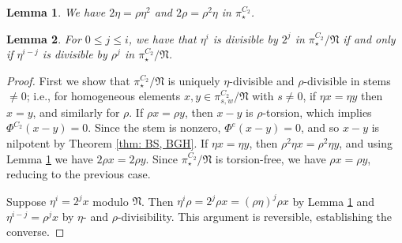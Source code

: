 \documentclass[10pt,a4paper]{amsart}
\newtheorem{lemma}{Lemma}
\newcommand{\fN}{\mathfrak N}
\begin{document}
\begin{lemma}\label{lem:2eta}
We have $2\eta = \rho \eta^2$ and $2\rho = \rho^2 \eta$ in $\pi_\star^{C_2}$.
\end{lemma}

\begin{lemma}\label{lem:2-to-eta}
For $0\leq j\leq i$,
we have that $\eta^i$ is divisible by $2^j$ in $\pi_\star^{C_2}/\fN$ if and only if
$\eta^{i-j}$ is divisible by $\rho^j$ in $\pi_\star^{C_2}/\fN$.
\end{lemma}

\begin{proof}
First we show that $\pi_\star^{C_2}/\fN$ is uniquely $\eta$-divisible and
$\rho$-divisible in stems $\neq 0$; i.e., for homogeneous elements $x,y\in
\pi_{s,w}^{C_2}/\fN$ with $s\neq 0$,
if $\eta x = \eta y$ then $x = y$, and similarly for $\rho$.
If $\rho x = \rho y$, then $x-y$ is $\rho$-torsion, which implies
$\Phi^{C_2}(x-y)=0$. Since the stem is nonzero, $\Phi^e(x-y)=0$, and so $x-y$ is
nilpotent by Theorem \ref{thm: BS, BGH}.
If $\eta x = \eta y$, then $\rho^2 \eta x = \rho^2 \eta y$, and using Lemma
\ref{lem:2eta} we have $2\rho x = 2\rho y$. Since $\pi_\star^{C_2}/\fN$ is
torsion-free, we have $\rho x = \rho y$, reducing to the previous case.

Suppose $\eta^i = 2^j x$ modulo $\fN$. Then $\eta^i \rho = 2^j \rho x = (\rho
\eta)^j \rho x$ by Lemma \ref{lem:2eta} and $\eta^{i-j} = \rho^j x$ by $\eta$-
and $\rho$-divisibility. This argument is reversible, establishing the converse.
\end{proof}
\end{document}
